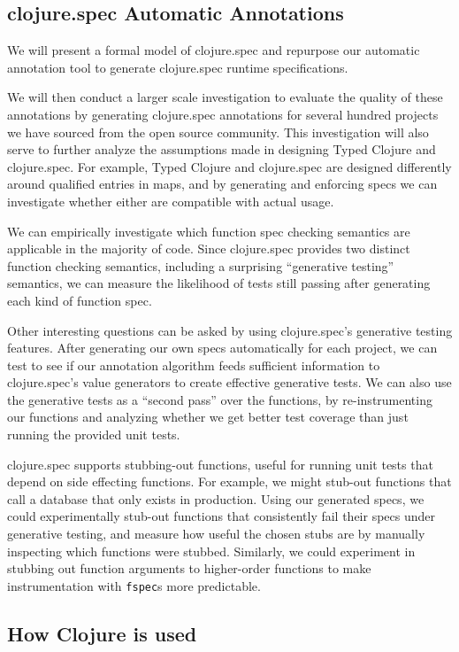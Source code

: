 \documentclass[9pt]{extarticle}
\begin{document}
\subsection{clojure.spec Automatic Annotations}

We will present a formal model of clojure.spec and repurpose our automatic annotation
tool to generate clojure.spec runtime specifications.

We will then conduct a larger scale investigation to evaluate the quality 
of these annotations by generating clojure.spec annotations for several hundred
projects we have sourced from the open source community.
This investigation will also serve to further analyze the assumptions made 
in designing Typed Clojure and clojure.spec.
For example, Typed Clojure and clojure.spec are designed differently
around qualified entries in maps, and by generating and enforcing specs
we can investigate whether either are compatible with actual usage.

We can empirically investigate which function spec checking semantics are 
applicable in the majority of code. Since clojure.spec provides
two distinct function checking semantics, including a surprising
``generative testing'' semantics, we can measure the likelihood
of tests still passing after generating each kind of function spec.

Other interesting questions can be asked by using clojure.spec's generative
testing features. After generating our own specs automatically for each project,
we can test to see if our annotation algorithm feeds sufficient information
to clojure.spec's value generators to create effective generative tests.
We can also use the generative tests as a ``second pass'' over the functions,
by re-instrumenting our functions and analyzing whether we get better
test coverage than just running the provided unit tests.

clojure.spec supports stubbing-out functions, useful for running unit
tests that depend on side effecting functions. For example, we might
stub-out functions that call a database that only exists in production.
Using our generated specs, we could experimentally stub-out functions
that consistently fail their specs under generative testing,
and measure how useful the chosen stubs are by manually inspecting
which functions were stubbed.
Similarly, we could experiment in stubbing out function arguments
to higher-order functions to make instrumentation with \texttt{fspec}s
more predictable.

\subsection{How Clojure is used}
\end{document}
